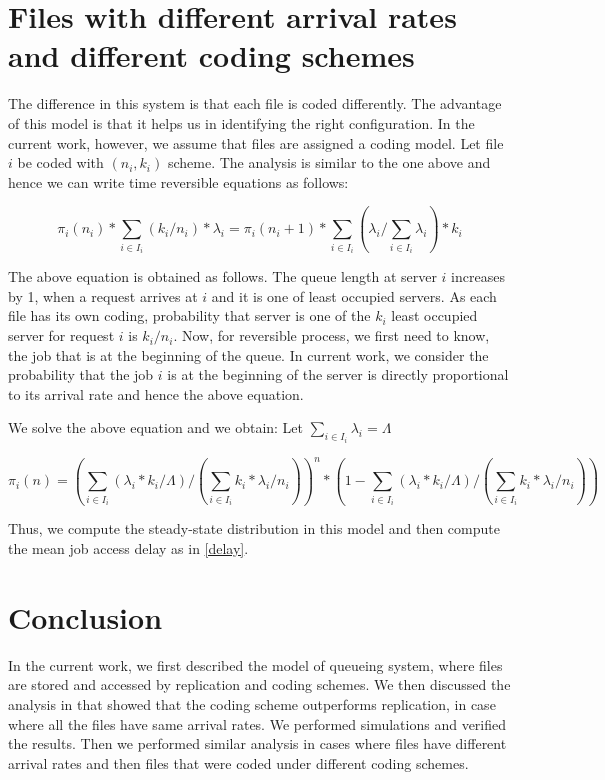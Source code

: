 \documentclass{article}
\begin{document}
\section{Files with different arrival rates and different coding schemes}

The difference in this system is that each file is coded differently. The advantage of this model is that it helps us in identifying the right configuration. In the current work, however, we assume that files are assigned a coding model. Let file $i$ be coded with $(n_{i},k_{i})$ scheme. The analysis is similar to the one above and hence we can write time reversible equations as follows:

$$
\pi_{i}(n_{i})*\sum_{i \in I_{i}}(k_{i}/n_{i})*\lambda_{i}  = \pi_{i}(n_{i}+1)*\sum_{i \in I_{i}} (\lambda_{i}/\sum_{i \in I_{i}}\lambda_{i}) *k_{i}
$$

The above equation is obtained as follows. The queue length at server $i$ increases by 1, when a request arrives at $i$ and it is one of least occupied servers. As each file has its own coding, probability that server is one of the $k_{i}$ least occupied server for request $i$ is $k_{i}/n_{i}$. Now, for reversible process, we first need to know, the job that is at the beginning of the queue. In current work, we consider the probability that the job $i$ is at the beginning of the server is directly proportional to its arrival rate and hence the above equation. 

We solve the above equation and we obtain: Let $\sum_{i \in I_{i}} \lambda_{i} = \Lambda$

$$
\pi_{i}(n) = (\sum_{i \in I_{i}} (\lambda_{i}*k_{i}/\Lambda )/(\sum_{i \in I_{i}} k_{i}*\lambda_{i}/n_{i}))^{n}*(1 - \sum_{i \in I_{i}} (\lambda_{i}*k_{i}/\Lambda )/(\sum_{i \in I_{i}} k_{i}*\lambda_{i}/n_{i}))
$$

Thus, we compute the steady-state distribution in this model and then compute the mean job access delay as in \eqref{delay}.

\section{Conclusion}

In the current work, we first described the model of queueing system, where files are stored and accessed by replication and coding schemes. We then discussed the analysis in \cite{imppaper} that showed that the coding scheme outperforms replication, in case where all the files have same arrival rates. We performed simulations and verified the results. Then we performed similar analysis in cases where files have different arrival rates and then files that were coded under different coding schemes. 
\end{document}
